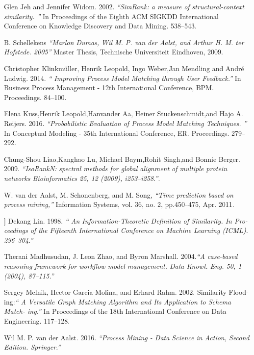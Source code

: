 \documentclass[runningheads]{llncs}
\begin{document}

\begin{thebibliography}{9}
Glen Jeh and Jennifer Widom. 2002. \textit{“SimRank: a measure of structural-context similarity. ”} In Proceedings of the Eighth ACM SIGKDD International Conference on Knowledge Discovery and Data Mining. 538–543.

 B. Schellekens \textit{“Marlon Dumas, Wil M. P. van der Aalst, and Arthur H. M. ter Hofstede. 2005”} Master Thesis, Technische Universiteit Eindhoven, 2009.

Christopher Klinkmüller, Henrik Leopold, Ingo Weber,Jan Mendling and André Ludwig. 2014. \textit{“ Improving Process Model Matching through User Feedback.”} In Business Process Management - 12th International Conference, BPM. Proceedings. 84–100.

 Elena Kuss,Henrik Leopold,Hanvander Aa, Heiner Stuckenschmidt,and Hajo A. Reijers. 2016. \textit{“Probabilistic Evaluation of Process Model Matching Techniques.  ”} In Conceptual Modeling - 35th International Conference, ER. Proceedings. 279–292.

Chung-Shou Liao,Kanghao Lu, Michael Baym,Rohit Singh,and Bonnie Berger. 2009. \textit{“IsoRankN: spectral methods for global alignment of multiple protein networks Bioinformatics 25, 12 (2009), i253–i258.”}.

W. van der Aalst, M. Schonenberg, and M. Song, \textit{“Time prediction based on process mining,”} Information Systems, vol. 36, no. 2, pp.450–475, Apr. 2011.

] Dekang Lin. 1998. \textit{“ An Information-Theoretic Definition of Similarity. In Pro- ceedings of the Fifteenth International Conference on Machine Learning (ICML). 296–304.”}

Therani Madhusudan, J. Leon Zhao, and Byron Marshall. 2004.\textit{“A case-based reasoning framework for workflow model management. Data Knowl. Eng. 50, 1 (2004), 87–115.”} 

 Sergey Melnik, Hector Garcia-Molina, and Erhard Rahm. 2002. Similarity Flood- ing:\textit{“ A Versatile Graph Matching Algorithm and Its Application to Schema Match- ing.”} In Proceedings of the 18th International Conference on Data Engineering. 117–128.

Wil M. P. van der Aalst. 2016.  \textit{“Process Mining - Data Science in Action, Second Edition. Springer.”}


\end{thebibliography}
\end{document}
